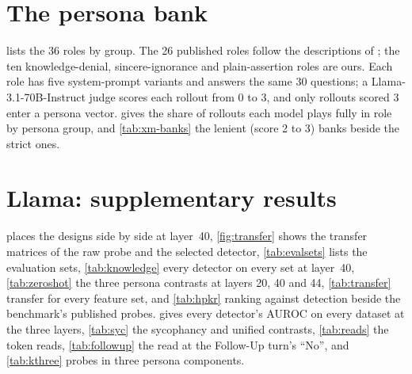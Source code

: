 
\FloatBarrier
\section{The persona bank}
\label{app:bank}

 lists the 36 roles by group. The 26 published roles follow the descriptions of
\citet{mahadik2026persona}; the ten knowledge-denial, sincere-ignorance and plain-assertion roles are ours.
Each role has five system-prompt variants and answers the same 30 questions; a Llama-3.1-70B-Instruct
judge scores each rollout from 0 to 3, and only rollouts scored 3 enter a persona vector.
 gives the share of rollouts each model plays fully in role by persona group, and
\cref{tab:xm-banks} the lenient (score 2 to 3) banks beside the strict ones.

\begin{table}[h]
\centering
\scriptsize
\caption{The roles of the bank by group.}
\label{tab:roster}
\resizebox{\linewidth}{!}{}
\end{table}

\begin{table}[h]
\centering
\footnotesize
\caption{The share of rollouts the judge scored fully in role, by persona group and model.}
\label{tab:xm-roleplay}

\end{table}

\begin{table}[h]
\centering
\footnotesize
\caption{Each model's persona banks at its middle block: the strict bank and the lenient one.}
\label{tab:xm-banks}
\resizebox{\linewidth}{!}{}
\end{table}

\FloatBarrier
\section{Llama: supplementary results}
\label{app:llama}

 places the designs side by side at layer~40, \cref{fig:transfer} shows the transfer
matrices of the raw probe and the selected detector, \cref{tab:evalsets} lists the evaluation sets,
\cref{tab:knowledge} every detector on every set at layer~40, \cref{tab:zeroshot} the three persona contrasts at layers 20, 40 and 44, \cref{tab:transfer}
transfer for every feature set, and \cref{tab:hpkr} \hpkr{} ranking against detection beside the
benchmark's published probes.  gives every detector's AUROC on every dataset at the
three layers, \cref{tab:syc} the sycophancy and unified contrasts, \cref{tab:reads} the token reads,
\cref{tab:followup} the read at the Follow-Up turn's ``No'', and \cref{tab:kthree} probes in three persona
components.

